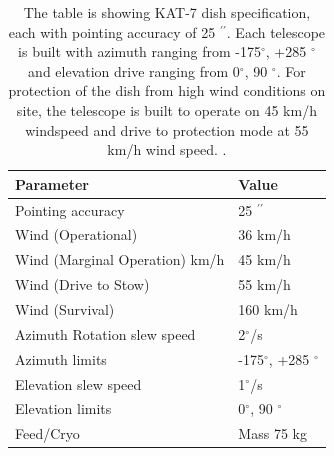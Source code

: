 
\begin{table}[H]\centering
\begin{tabular}{l l }
\toprule
\textbf{Parameter} & \textbf{Value}\\
\midrule
Pointing accuracy & 25 $^{\prime \prime}$ \\
Wind (Operational) & 36 km/h\\
Wind (Marginal Operation) km/h & 45 km/h\\
Wind (Drive to Stow) & 55 km/h\\
Wind (Survival) & 160 km/h\\
Azimuth Rotation slew speed &  2$^\circ$/s\\
Azimuth limits & -175$^{\circ}$, +285 $^{\circ}$\\
Elevation slew speed & 1$^{\circ}$/s\\
Elevation limits & 0$^{\circ}$, 90 $^{\circ}$\\
Feed/Cryo & Mass 75 kg\\
\bottomrule
\end{tabular}
\caption{The table is showing KAT-7 dish specification, each with pointing accuracy of 25 $^{\prime \prime}$. Each telescope is built with azimuth ranging from -175$^{\circ}$, +285 $^{\circ}$ and elevation drive ranging from 0$^{\circ}$, 90 $^{\circ}$. For protection of the dish from high wind conditions on site, the telescope is built to operate on 45 km/h windspeed and drive to protection mode at 55 km/h wind speed. \citep{foley2016engineering}.}
\label{DSpec}
\end{table}

